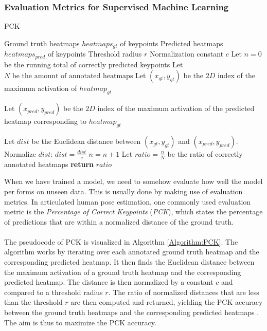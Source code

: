 \documentclass[./main.tex]{subfiles}
\begin{document}
\subsubsection{Evaluation Metrics for Supervised Machine Learning}
\begin{algorithm}[t]
    \caption{PCK \cite{Camilla}\cite{SHG}}
    \label{Algorithm:PCK}
    \begin{algorithmic}[1]
        \Require Ground truth heatmaps $heatmaps_{gt}$ of keypoints
        \Require Predicted heatmaps $heatmaps_{pred}$ of keypoints
        \Require Threshold radius $r$
        \Require Normalization constant $c$
        \State Let $n = 0$ be the running total of correctly predicted keypoints
        \State Let $N \text{ be the amount of annotated heatmaps}$
            \State Let $(x_{gt}, y_{gt})$ be the $2D$ index of the maximum activation of $heatmap_{gt}$
            \State \begin{varwidth}[t]{\linewidth}
                Let $(x_{pred}, y_{pred})$ be the $2D$ index of the maximum activation of the predicted heatmap corresponding to $heatmap_{gt}$
            \end{varwidth}
            \State Let $dist$ be the Euclidean distance between $(x_{gt}, y_{gt})$ and $(x_{pred}, y_{pred})$.
            \State Normalize $dist$: $dist = \frac{dist}{c}$
                \State $n = n + 1$
            \EndIf
        \EndFor
        \State Let $ratio = \frac{n}{N}$ be the ratio of correctly annotated heatmaps
        \State \textbf{return} $ratio$
    \end{algorithmic}
\end{algorithm}
\noindent When we have trained a model, we need to somehow evaluate how well the model per forms on unseen data. This is usually done by making use of evaluation metrics. In articulated human pose estimation, one commonly used evaluation metric is the \textit{Percentage of Correct Keypoints} (\textit{PCK}), which states the percentage of predictions that are within a normalized distance of the ground truth.
\\
\\
The pseudocode of PCK is visualized in Algorithm \ref{Algorithm:PCK}. The algorithm works by iterating over each annotated ground truth heatmap and the corresponding predicted heatmap. It then finds the Euclidean distance between the maximum activation of a ground truth heatmap and the corresponding predicted heatmap. The distance is then normalized by a constant $c$ and compared to a threshold radius $r$. The ratio of normalized distances that are less than the threshold $r$ are then computed and returned, yielding the PCK accuracy between the ground truth heatmaps and the corresponding predicted heatmaps \cite{Camilla} \cite{SHG}. The aim is thus to maximize the PCK accuracy.
\end{document}
